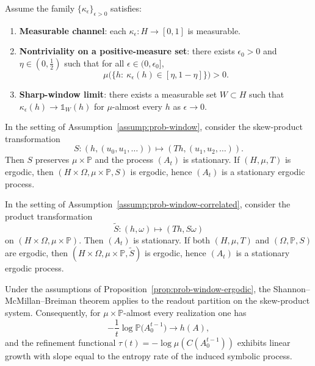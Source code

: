 \begin{assumption}\label{assump:kappa-regularity}
Assume the family $\{\kappa_\epsilon\}_{\epsilon>0}$ satisfies:
\begin{enumerate}[label=(\roman*),leftmargin=*,itemsep=2pt]
  \item \textbf{Measurable channel}: each $\kappa_\epsilon:H\to[0,1]$ is measurable.
  \item \textbf{Nontriviality on a positive-measure set}: there exists $\epsilon_0>0$ and $\eta\in(0,\tfrac12)$ such that for all $\epsilon\in(0,\epsilon_0]$,
  \[
  \mu\bigl(\{h:\ \kappa_\epsilon(h)\in[\eta,1-\eta]\}\bigr)>0.
  \]
  \item \textbf{Sharp-window limit}: there exists a measurable set $W\subset H$ such that $\kappa_\epsilon(h)\to \mathds{1}_W(h)$ for $\mu$-almost every $h$ as $\epsilon\to 0$.
\end{enumerate}
\end{assumption}

\begin{proposition}\label{prop:prob-window-ergodic}
In the setting of Assumption~\ref{assump:prob-window}, consider the skew-product transformation
\[
S:(h,(u_0,u_1,\dots))\mapsto (Th,(u_1,u_2,\dots)).
\]
Then $S$ preserves $\mu\times\mathbb{P}$ and the process $(A_t)$ is stationary. If $(H,\mu,T)$ is ergodic, then $(H\times\Omega,\mu\times\mathbb{P},S)$ is ergodic, hence $(A_t)$ is a stationary ergodic process.
\end{proposition}

\begin{proposition}\label{prop:prob-window-correlated-ergodic}
In the setting of Assumption~\ref{assump:prob-window-correlated}, consider the product transformation
\[
\widetilde S:(h,\omega)\mapsto (Th,S\omega)
\]
on $(H\times\Omega,\mu\times\mathbb{P})$. Then $(A_t)$ is stationary. If both $(H,\mu,T)$ and $(\Omega,\mathbb{P},S)$ are ergodic, then $(H\times\Omega,\mu\times\mathbb{P},\widetilde S)$ is ergodic, hence $(A_t)$ is a stationary ergodic process.
\end{proposition}

\begin{corollary}\label{cor:smb-prob-window}
Under the assumptions of Proposition~\ref{prop:prob-window-ergodic}, the Shannon--McMillan--Breiman theorem applies to the readout partition on the skew-product system. Consequently, for $\mu\times\mathbb{P}$-almost every realization one has
\[
-\frac{1}{t}\log \mathbb{P}\bigl(A_0^{t-1}\bigr)\to h(A),
\]
and the refinement functional $\tau(t)=-\log\mu(C(A_0^{t-1}))$ exhibits linear growth with slope equal to the entropy rate of the induced symbolic process.
\end{corollary}

